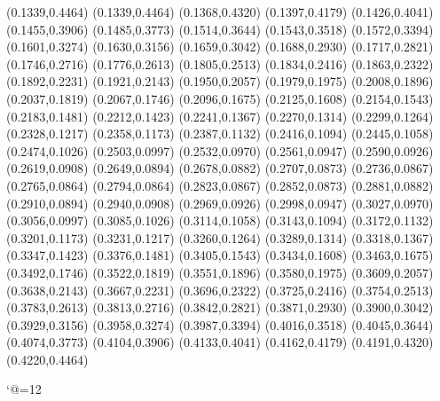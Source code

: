 \PST@Solid(0.1339,0.4464)
(0.1339,0.4464)
(0.1368,0.4320)
(0.1397,0.4179)
(0.1426,0.4041)
(0.1455,0.3906)
(0.1485,0.3773)
(0.1514,0.3644)
(0.1543,0.3518)
(0.1572,0.3394)
(0.1601,0.3274)
(0.1630,0.3156)
(0.1659,0.3042)
(0.1688,0.2930)
(0.1717,0.2821)
(0.1746,0.2716)
(0.1776,0.2613)
(0.1805,0.2513)
(0.1834,0.2416)
(0.1863,0.2322)
(0.1892,0.2231)
(0.1921,0.2143)
(0.1950,0.2057)
(0.1979,0.1975)
(0.2008,0.1896)
(0.2037,0.1819)
(0.2067,0.1746)
(0.2096,0.1675)
(0.2125,0.1608)
(0.2154,0.1543)
(0.2183,0.1481)
(0.2212,0.1423)
(0.2241,0.1367)
(0.2270,0.1314)
(0.2299,0.1264)
(0.2328,0.1217)
(0.2358,0.1173)
(0.2387,0.1132)
(0.2416,0.1094)
(0.2445,0.1058)
(0.2474,0.1026)
(0.2503,0.0997)
(0.2532,0.0970)
(0.2561,0.0947)
(0.2590,0.0926)
(0.2619,0.0908)
(0.2649,0.0894)
(0.2678,0.0882)
(0.2707,0.0873)
(0.2736,0.0867)
(0.2765,0.0864)
(0.2794,0.0864)
(0.2823,0.0867)
(0.2852,0.0873)
(0.2881,0.0882)
(0.2910,0.0894)
(0.2940,0.0908)
(0.2969,0.0926)
(0.2998,0.0947)
(0.3027,0.0970)
(0.3056,0.0997)
(0.3085,0.1026)
(0.3114,0.1058)
(0.3143,0.1094)
(0.3172,0.1132)
(0.3201,0.1173)
(0.3231,0.1217)
(0.3260,0.1264)
(0.3289,0.1314)
(0.3318,0.1367)
(0.3347,0.1423)
(0.3376,0.1481)
(0.3405,0.1543)
(0.3434,0.1608)
(0.3463,0.1675)
(0.3492,0.1746)
(0.3522,0.1819)
(0.3551,0.1896)
(0.3580,0.1975)
(0.3609,0.2057)
(0.3638,0.2143)
(0.3667,0.2231)
(0.3696,0.2322)
(0.3725,0.2416)
(0.3754,0.2513)
(0.3783,0.2613)
(0.3813,0.2716)
(0.3842,0.2821)
(0.3871,0.2930)
(0.3900,0.3042)
(0.3929,0.3156)
(0.3958,0.3274)
(0.3987,0.3394)
(0.4016,0.3518)
(0.4045,0.3644)
(0.4074,0.3773)
(0.4104,0.3906)
(0.4133,0.4041)
(0.4162,0.4179)
(0.4191,0.4320)
(0.4220,0.4464)

\catcode`@=12
\fi
\endpspicture
